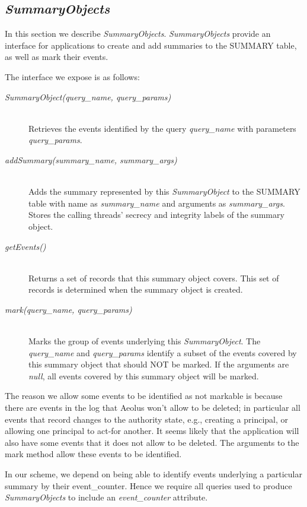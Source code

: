 \subsection{\emph{SummaryObjects}}
\label{model:summary-objects}

In this section we describe \emph{SummaryObjects}. \emph{SummaryObjects} provide an interface for applications to create and add summaries to the SUMMARY table, as well as mark their events.

The interface we expose is as follows:
\begin{description}
  \item[\emph{SummaryObject(query\_name, query\_params)}] \ \\
    Retrieves the events identified by the query
    \emph{query\_name} with parameters \emph{query\_params}.
  \item[\emph{addSummary(summary\_name, summary\_args)}] \ \\
    Adds the summary represented by this 
    \emph{SummaryObject} to the SUMMARY table with
    name as \emph{summary\_name} and arguments
    as \emph{summary\_args}.
    Stores the calling threads' secrecy and integrity
    labels of the summary object.
  \item[\emph{getEvents()}] \ \\
    Returns a set of records that this summary object
    covers.
    This set of records is determined when the summary
    object is created.
  \item[\emph{mark(query\_name, query\_params)}] \ \\
    Marks the group of events underlying this
    \emph{SummaryObject}. The \emph{query\_name}
    and \emph{query\_params} identify a subset
    of the events covered by this summary object
    that should NOT be marked.
    If the arguments are \emph{null}, all events
    covered by this summary object will be marked.
\end{description}

\noindent
The reason we allow some events to be identified as not markable is because there are events in the log that Aeolus won't allow to be deleted; in particular all events that record changes to the authority state, e.g., creating a principal, or allowing one principal to act-for another. It seems likely that the application will also have some events that it does not allow to be deleted. The arguments to the mark method allow these events to be identified.

In our scheme, we depend on being able to identify events underlying a particular summary by their event\_counter. Hence we require all queries used to produce \emph{SummaryObjects} to include an \emph{event\_counter} attribute.

